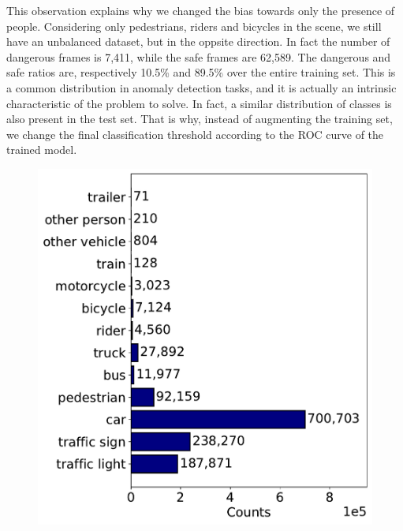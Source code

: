 This observation explains why we changed the bias towards only the presence of 
people. Considering only pedestrians, riders and bicycles in the scene, we still 
have an unbalanced dataset, but in the oppsite direction. In fact the number of 
dangerous frames is 7,411, while the safe frames are 62,589. The dangerous and 
safe ratios are, respectively 10.5\% and 89.5\% over the entire training set.
This is a common distribution in anomaly detection tasks, and it is actually an 
intrinsic characteristic of the problem to solve. In fact, a similar distribution 
of classes is also present in the test set. That is why, instead of augmenting 
the training set, we change the final classification threshold according to the 
ROC curve of the trained model.

\begin{figure}
    \centering
    \begin{minipage}{0.49\textwidth}
        \centering
        \includegraphics[width=\textwidth]{images/bdd100k/object_counts.pdf}
    \end{minipage}\hfill
    \begin{minipage}{0.49\textwidth}
        \centering

\end{minipage}
\end{figure}
